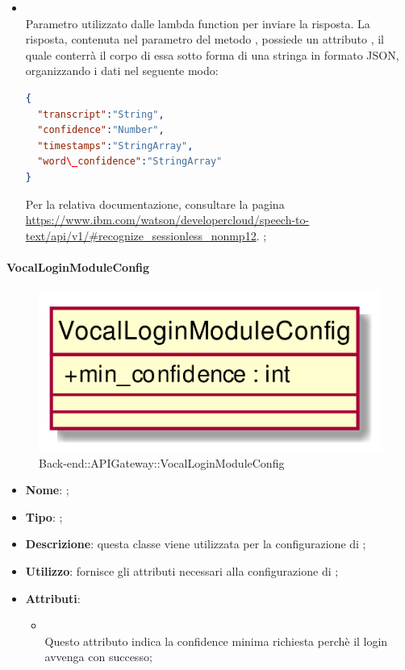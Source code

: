 \begin{itemize}
\begin{itemize}
\begin{itemize}
\begin{lstlisting}[language=json,firstnumber=1]
}
\end{lstlisting};
			\item {} \\
			Parametro utilizzato dalle lambda function per inviare la risposta. La risposta, contenuta nel  parametro del metodo , possiede un attributo , il quale conterrà il corpo di essa sotto forma di una stringa in formato JSON, organizzando i dati nel seguente modo:
\begin{lstlisting}[language=json,firstnumber=1]
{
  "transcript":"String",
  "confidence":"Number",
  "timestamps":"StringArray",
  "word\_confidence":"StringArray"
}
\end{lstlisting}
Per la relativa documentazione, consultare la pagina \url{https://www.ibm.com/watson/developercloud/speech-to-text/api/v1/#recognize\_sessionless\_nonmp12}.
;
		\end{itemize}
	\end{itemize}
\end{itemize}

\hypertarget{VocalLoginModuleConfig_label}{\paragraph{VocalLoginModuleConfig}}
\begin{figure}[h]
	\centering
	\includegraphics[width=\textwidth,height=\textheight,keepaspectratio]{images/ClassVocalLoginModuleConfig.png}
	\caption{Back-end::APIGateway::VocalLoginModuleConfig}
\end{figure}
\begin{itemize}
	\item \textbf{Nome}: ;
	\item \textbf{Tipo}: ;
	\item \textbf{Descrizione}: questa classe viene utilizzata per la configurazione di ;
	\item \textbf{Utilizzo}: fornisce gli attributi necessari alla configurazione di ;
	\item \textbf{Attributi}:
	\begin{itemize}
		\item[]  \\
		Questo attributo indica la confidence minima richiesta perchè il login avvenga con successo;
	\end{itemize}
\end{itemize}

